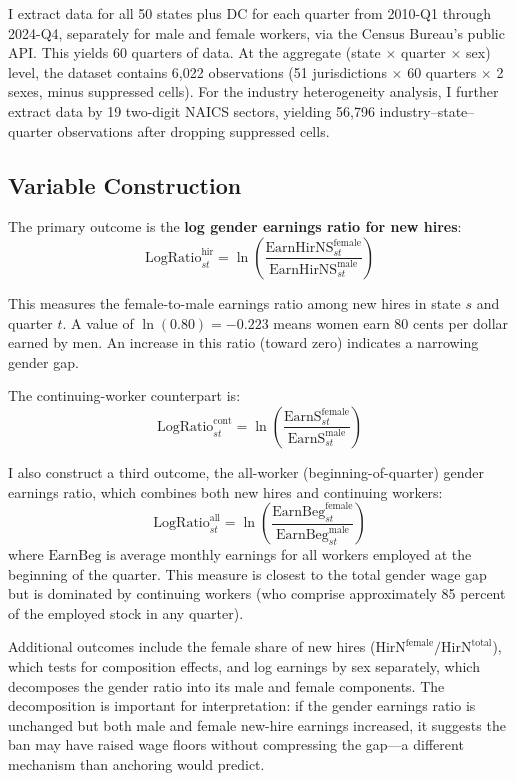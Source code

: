 \documentclass[12pt]{article}
\begin{document}
I extract data for all 50 states plus DC for each quarter from 2010-Q1 through 2024-Q4, separately for male and female workers, via the Census Bureau's public API. This yields 60 quarters of data. At the aggregate (state $\times$ quarter $\times$ sex) level, the dataset contains 6,022 observations (51 jurisdictions $\times$ 60 quarters $\times$ 2 sexes, minus suppressed cells). For the industry heterogeneity analysis, I further extract data by 19 two-digit NAICS sectors, yielding 56,796 industry--state--quarter observations after dropping suppressed cells.

\subsection{Variable Construction}

The primary outcome is the \textbf{log gender earnings ratio for new hires}:
\begin{equation}
  \text{LogRatio}_{st}^{\text{hir}} = \ln\left(\frac{\text{EarnHirNS}_{st}^{\text{female}}}{\text{EarnHirNS}_{st}^{\text{male}}}\right)
\end{equation}

This measures the female-to-male earnings ratio among new hires in state $s$ and quarter $t$. A value of $\ln(0.80) = -0.223$ means women earn 80 cents per dollar earned by men. An increase in this ratio (toward zero) indicates a narrowing gender gap.

The continuing-worker counterpart is:
\begin{equation}
  \text{LogRatio}_{st}^{\text{cont}} = \ln\left(\frac{\text{EarnS}_{st}^{\text{female}}}{\text{EarnS}_{st}^{\text{male}}}\right)
\end{equation}

I also construct a third outcome, the all-worker (beginning-of-quarter) gender earnings ratio, which combines both new hires and continuing workers:
\begin{equation}
  \text{LogRatio}_{st}^{\text{all}} = \ln\left(\frac{\text{EarnBeg}_{st}^{\text{female}}}{\text{EarnBeg}_{st}^{\text{male}}}\right)
\end{equation}
where $\text{EarnBeg}$ is average monthly earnings for all workers employed at the beginning of the quarter. This measure is closest to the total gender wage gap but is dominated by continuing workers (who comprise approximately 85 percent of the employed stock in any quarter).

Additional outcomes include the female share of new hires ($\text{HirN}^{\text{female}} / \text{HirN}^{\text{total}}$), which tests for composition effects, and log earnings by sex separately, which decomposes the gender ratio into its male and female components. The decomposition is important for interpretation: if the gender earnings ratio is unchanged but both male and female new-hire earnings increased, it suggests the ban may have raised wage floors without compressing the gap---a different mechanism than anchoring would predict.
\end{document}
